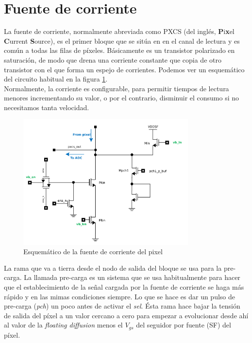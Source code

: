 \section{Fuente de corriente}\label{cap:ro_sch_pxcs}

La fuente de corriente, normalmente abreviada como PXCS (del inglés,
\textbf{P}i\textbf{x}el \textbf{C}urrent \textbf{S}ource),
es el primer bloque que se sitúa en
en el canal de lectura y es común a todas las filas de píxeles. Básicamente
es un transistor polarizado en saturación, de modo que drena una corriente
constante que copia de otro transistor con el que forma un espejo de corrientes.
Podemos ver un esquemático del circuito habitual en la figura \ref{fig:pxcs_sch}.\\

Normalmente, la corriente es configurable, para permitir tiempos de lectura menores
incrementando su  valor, o por el contrario, disminuir el consumo si no necesitamos tanta
velocidad.

\begin{figure}[h]
	\centering
	\includegraphics[width=0.8\textwidth]{svg/pxcs_sch.pdf}
	\caption{Esquemático de la fuente de corriente del pixel}
	\label{fig:pxcs_sch}
\end{figure}

La rama que va a tierra desde el nodo de salida del bloque se usa para la pre-carga.
La llamada pre-carga es un sistema que se usa habitualmente para hacer que el
establecimiento de la señal cargada por la fuente de corriente se haga más rápido
y en las mimas condiciones siempre. Lo que se hace es dar un pulso de pre-carga
(\textit{pch}) un poco antes de activar el \textit{sel}. Ésta rama hace bajar la
tensión de salida del píxel a un valor cercano a cero para empezar a evolucionar
desde ahí al valor de la \textit{floating diffusion} menos el $V_{gs}$ del seguidor
por fuente (SF) del píxel.\\

